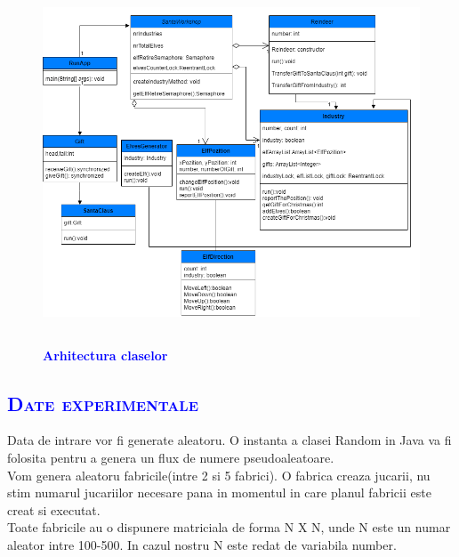 \documentclass{article}
\begin{document}
\begin{figure}
   \centering
   \includegraphics[width=14cm, height=10cm]{Arhitecture.png}
   \bfseries\caption{\textbf{\textcolor{blue}{Arhitectura claselor}}}
\end{figure}


\newpage

\begin{center}
     \textcolor{blue}{\section{\bfseries\scshape\textcolor{blue}{Date experimentale}}}
\end{center}

Data de intrare vor fi generate aleatoru. O instanta a clasei Random in Java va fi folosita pentru a genera un flux de numere pseudoaleatoare.\\ \newline
Vom genera aleatoru fabricile(intre 2 si 5 fabrici). O fabrica creaza jucarii, nu stim numarul jucariilor necesare pana in momentul in care planul fabricii este creat si executat.\\\newline Toate fabricile au o dispunere matriciala de forma N X N, unde N este un numar aleator intre 100-500. In cazul nostru N este redat de variabila number.\\
\end{document}
